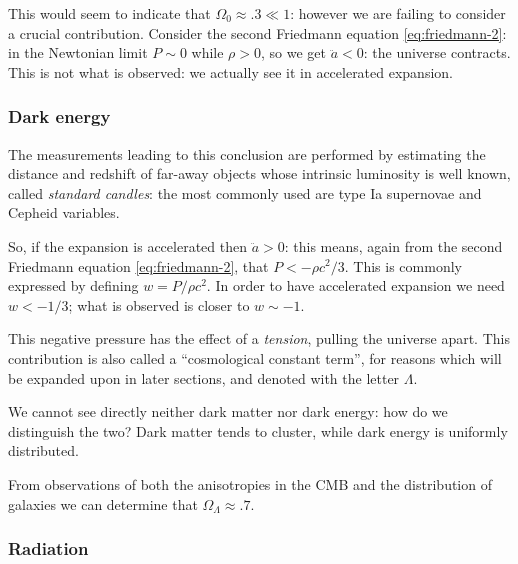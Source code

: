 \documentclass[main.tex]{subfiles}
\begin{document}
This would seem to indicate that \(\Omega_{0} \approx \num{.3} \ll 1\): however we are failing to consider a crucial contribution.
Consider the second Friedmann equation \eqref{eq:friedmann-2}: in the Newtonian limit \(P \sim 0\) while \( \rho >0 \), so we get \(\ddot{a} <0\): the universe contracts.
This is not what is observed: we actually see it in accelerated expansion.

\subsubsection{Dark energy}

The measurements leading to this conclusion are performed by estimating the distance and redshift of far-away objects whose intrinsic luminosity is well known, called \emph{standard candles}: the most commonly used are type Ia supernovae and Cepheid variables.

So, if the expansion is accelerated then \(\ddot{a} > 0\): this means, again from the second Friedmann equation \eqref{eq:friedmann-2}, that \(P < -\rho c^2/3\).
This is commonly expressed by defining \(w = P / \rho c^2\). 
In order to have accelerated expansion we need \(w < -1/3\); what is observed is closer to \(w \sim -1\).

This negative pressure has the effect of a \emph{tension}, pulling the universe apart.
This contribution is also called a ``cosmological constant term'', for reasons which will be expanded upon in later sections, and denoted with the letter \(\Lambda \).

We cannot see directly neither dark matter nor dark energy: how do we distinguish the two? Dark matter tends to cluster, while dark energy is uniformly distributed.

From observations of both the anisotropies in the CMB and the distribution of galaxies we can determine that \(\Omega_{\Lambda } \approx \num{.7}\).


\subsubsection{Radiation}
\end{document}
